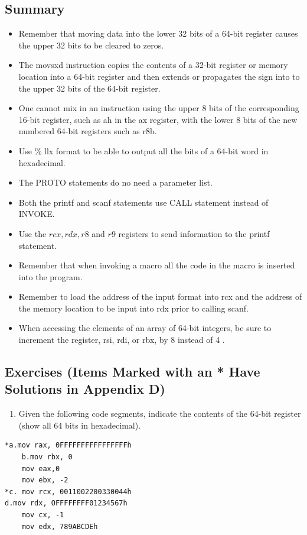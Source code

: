 \documentclass[10pt]{book}
\begin{document}
\subsection{Summary}
\begin{itemize}
  \item Remember that moving data into the lower 32 bits of a 64-bit register causes the upper 32 bits to be cleared to zeros.
  \item The movsxd instruction copies the contents of a 32-bit register or memory location into a 64-bit register and then extends or propagates the sign into to the upper 32 bits of the 64-bit register.
  \item One cannot mix in an instruction using the upper 8 bits of the corresponding 16-bit register, such as ah in the ax register, with the lower 8 bits of the new numbered 64-bit registers such as r8b.
  \item Use \% llx format to be able to output all the bits of a 64-bit word in hexadecimal.
  \item The PROTO statements do no need a parameter list.
  \item Both the printf and scanf statements use CALL statement instead of INVOKE.
  \item Use the $r c x, r d x, r 8$ and $r 9$ registers to send information to the printf statement.
  \item Remember that when invoking a macro all the code in the macro is inserted into the program.
  \item Remember to load the address of the input format into rcx and the address of the memory location to be input into rdx prior to calling scanf.
  \item When accessing the elements of an array of 64-bit integers, be sure to increment the register, rsi, rdi, or rbx, by 8 instead of 4 .
\end{itemize}

\subsection{Exercises (Items Marked with an * Have Solutions in Appendix D)}
\begin{enumerate}
  \item Given the following code segments, indicate the contents of the 64-bit register (show all 64 bits in hexadecimal).
\end{enumerate}


\begin{verbatim}
*a.mov rax, 0FFFFFFFFFFFFFFFFh
    b.mov rbx, 0
    mov eax,0
    mov ebx, -2
*c. mov rcx, 0011002200330044h
d.mov rdx, OFFFFFFFF01234567h
    mov cx, -1
    mov edx, 789ABCDEh
\end{verbatim}
\end{document}
